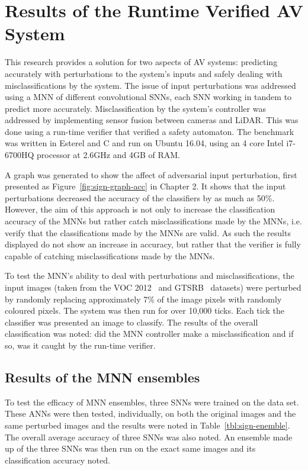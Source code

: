 \section{Results of the Runtime Verified AV System}

This research provides a solution for two aspects of \acf{AV} systems: predicting accurately with perturbations to the system's inputs and safely dealing with misclassifications by the system.
The issue of input perturbations was addressed using a \acf{MNN} of different convolutional \acfp{SNN}, each \ac{SNN} working in tandem to predict more accurately.
Misclassification by the system's controller was addressed by implementing sensor fusion between cameras and \ac{LiDAR}.
This was done using a run-time verifier that verified a safety automaton.
The benchmark was written in Esterel and C and run on Ubuntu 16.04, using an 4 core Intel i7-6700HQ processor at 2.6GHz and 4GB of RAM.

A graph was generated to show the affect of adversarial input perturbation, first presented as Figure~\ref{fig:sign-graph-acc} in Chapter 2.
It shows that the input perturbations decreased the accuracy of the classifiers by as much as 50\%.
However, the aim of this approach is not only to increase the classification accuracy of the \acp{MNN} but rather catch misclassifications made by the \acp{MNN}, i.e. verify that the classifications made by the \acp{MNN} are valid.
As such the results displayed do not show an increase in accuracy, but rather that the verifier is fully capable of catching misclassifications made by the \acp{MNN}.

To test the \ac{MNN}'s ability to deal with perturbations and misclassifications, the input images (taken from the \ac{VOC} 2012~\cite{pascal-voc-2012} and \ac{GTSRB}~\cite{Stallkamp2012-gtsrb} datasets) were perturbed by randomly replacing approximately 7\% of the image pixels with randomly coloured pixels.
The system was then run for over 10,000 ticks.
Each tick the classifier was presented an image to classify. 
The results of the overall classification was noted: did the \ac{MNN} controller make a misclassification and if so, was it caught by the run-time verifier.

\subsection{Results of the \ac{MNN} ensembles}
To test the efficacy of \ac{MNN} ensembles, three \acp{SNN} were trained on the data set.
These \acp{ANN} were then tested, individually, on both the original images and the same perturbed images and the results were noted in Table~\ref{tbl:sign-enemble}.
The overall average accuracy of three \acp{SNN} was also noted.
An ensemble made up of the three \acp{SNN} was then run on the exact same images and its classification accuracy noted.

